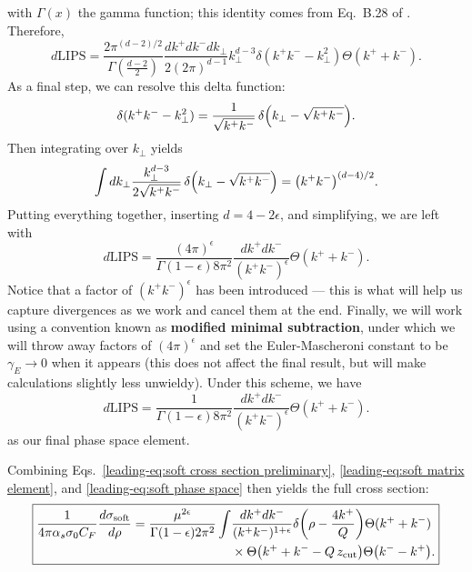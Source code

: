 \documentclass[../thesis.tex]{subfiles}
\providecommand{\zcut}{z_\mathrm{{cut}}}
\providecommand{\LIPS}{\mathrm{LIPS}}
\begin{document}
	with $\Gamma(x)$ the gamma function; this identity comes from Eq.\ B.28 of \cite{schwartz_quantum_2014}.
	Therefore,
	\begin{equation}
		d\LIPS = \frac{2\pi^{(d-2)/2}}{\Gamma(\frac{d-2}{2})} \frac{dk^+ dk^- dk_\perp}{2(2\pi)^{d-1}} k_\perp^{d-3} \delta(k^+ k^- - k_\perp^2)\Theta(k^+ + k^-).
	\end{equation}
	As a final step, we can resolve this delta function:
	\begin{equation}
		\delta(k^+ k^- - k_\perp^2) = \frac{1}{\sqrt{k^+ k^-}}\,\delta\qty(k_\perp - \sqrt{k^+ k^-}).
	\end{equation}
	Then integrating over $k_\perp$ yields
	\begin{equation}
		\int dk_\perp \frac{k_\perp^{d-3}}{2\sqrt{k^+ k^-}}\,\delta\qty(k_\perp - \sqrt{k^+ k^-}) = \qty(k^+ k^-)^{(d-4)/2}.
	\end{equation}
	Putting everything together, inserting $d = 4 - 2\epsilon$, and simplifying, we are left with
	\begin{equation}
		d\LIPS = \frac{(4\pi)^{\epsilon}}{\Gamma(1-\epsilon)8\pi^2}\frac{dk^+ dk^-}{(k^+ k^-)^\epsilon} \Theta(k^+ + k^-).
	\end{equation}
	Notice that a factor of $(k^+ k^-)^\epsilon$ has been introduced --- this is what will help us capture divergences as we work and cancel them at the end. Finally, we will work using a convention known as \textbf{modified minimal subtraction}, under which we will throw away factors of $(4\pi)^\epsilon$ and set the Euler-Mascheroni constant to be $\gamma_E \to 0$ when it appears (this does not affect the final result, but will make calculations slightly less unwieldy). Under this scheme, we have
	\begin{equation}\label{leading-eq:soft phase space}
		d\LIPS = \frac{1}{\Gamma(1-\epsilon)8\pi^2}\frac{dk^+ dk^-}{(k^+ k^-)^\epsilon} \Theta(k^+ + k^-).
	\end{equation}
	as our final phase space element.

	Combining Eqs.~\ref{leading-eq:soft cross section preliminary}, \ref{leading-eq:soft matrix element}, and \ref{leading-eq:soft phase space} then yields the full cross section:
	\begin{equation}\label{leading-eq:soft cross section integral}
	\boxed{
	\begin{aligned}
		\frac{1}{4\pi\alpha_s\sigma_0 C_F}\frac{d\sigma_{\text{soft}}}{d\rho} = \frac{\mu^{2\epsilon}}{\Gamma(1-\epsilon)2\pi^2}\int &\frac{dk^+ dk^-}{(k^+ k^-)^{1+\epsilon}} \delta\qty(\rho - \frac{4k^+}{Q}) \Theta(k^+ + k^-) \\
		&\times \Theta\qty(k^+ + k^- - Q\,\zcut)\Theta\qty(k^- - k^+).
	\end{aligned}
	}
	\end{equation}
\end{document}
